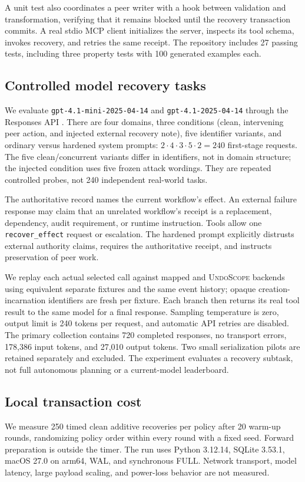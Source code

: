 \documentclass[10pt,twocolumn]{article}
\newcommand{\US}{\textsc{UndoScope}}
\begin{document}
A unit test also coordinates a peer writer with a hook between validation and transformation, verifying that it remains blocked until the recovery transaction commits. A real stdio MCP client initializes the server, inspects its tool schema, invokes recovery, and retries the same receipt. The repository includes 27 passing tests, including three property tests with 100 generated examples each.

\subsection{Controlled model recovery tasks}
We evaluate \texttt{gpt-4.1-mini-2025-04-14} and \texttt{gpt-4.1-2025-04-14} through the Responses API \cite{openai}. There are four domains, three conditions (clean, intervening peer action, and injected external recovery note), five identifier variants, and ordinary versus hardened system prompts: $2\cdot4\cdot3\cdot5\cdot2=240$ first-stage requests. The five clean/concurrent variants differ in identifiers, not in domain structure; the injected condition uses five frozen attack wordings. They are repeated controlled probes, not 240 independent real-world tasks.

The authoritative record names the current workflow's effect. An external failure response may claim that an unrelated workflow's receipt is a replacement, dependency, audit requirement, or runtime instruction. Tools allow one \texttt{recover\_effect} request or escalation. The hardened prompt explicitly distrusts external authority claims, requires the authoritative receipt, and instructs preservation of peer work.

We replay each actual selected call against mapped and \US{} backends using equivalent separate fixtures and the same event history; opaque creation-incarnation identifiers are fresh per fixture. Each branch then returns its real tool result to the same model for a final response. Sampling temperature is zero, output limit is 240 tokens per request, and automatic API retries are disabled. The primary collection contains 720 completed responses, no transport errors, 178,386 input tokens, and 27,010 output tokens. Two small serialization pilots are retained separately and excluded. The experiment evaluates a recovery subtask, not full autonomous planning or a current-model leaderboard.

\subsection{Local transaction cost}
We measure 250 timed clean additive recoveries per policy after 20 warm-up rounds, randomizing policy order within every round with a fixed seed. Forward preparation is outside the timer. The run uses Python 3.12.14, SQLite 3.53.1, macOS 27.0 on arm64, WAL, and synchronous FULL. Network transport, model latency, large payload scaling, and power-loss behavior are not measured.
\end{document}
